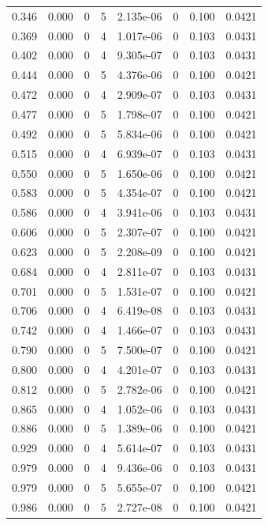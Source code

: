 \documentclass[preview]{standalone}
\begin{document}
{{\begin{tabular}{L{1.2cm}C{1.2cm} C{0.3cm}C{0.5cm} C{1.4cm}C{1.4cm} C{1.4cm}C{1.4cm}}
  0.346  &  0.000  & 0     &  5 &  2.135e-06  & 0  & 0.100 &  0.0421   \\ 
  0.369  &  0.000  & 0     &  4 &  1.017e-06  & 0  & 0.103 &  0.0431   \\ 
  0.402  &  0.000  & 0     &  4 &  9.305e-07  & 0  & 0.103 &  0.0431   \\ 
  0.444  &  0.000  & 0     &  5 &  4.376e-06  & 0  & 0.100 &  0.0421   \\ 
  0.472  &  0.000  & 0     &  4 &  2.909e-07  & 0  & 0.103 &  0.0431   \\ 
  0.477  &  0.000  & 0     &  5 &  1.798e-07  & 0  & 0.100 &  0.0421   \\ 
  0.492  &  0.000  & 0     &  5 &  5.834e-06  & 0  & 0.100 &  0.0421   \\ 
  0.515  &  0.000  & 0     &  4 &  6.939e-07  & 0  & 0.103 &  0.0431   \\ 
  0.550  &  0.000  & 0     &  5 &  1.650e-06  & 0  & 0.100 &  0.0421   \\ 
  0.583  &  0.000  & 0     &  5 &  4.354e-07  & 0  & 0.100 &  0.0421   \\ 
  0.586  &  0.000  & 0     &  4 &  3.941e-06  & 0  & 0.103 &  0.0431   \\ 
  0.606  &  0.000  & 0     &  5 &  2.307e-07  & 0  & 0.100 &  0.0421   \\ 
  0.623  &  0.000  & 0     &  5 &  2.208e-09  & 0  & 0.100 &  0.0421   \\ 
  0.684  &  0.000  & 0     &  4 &  2.811e-07  & 0  & 0.103 &  0.0431   \\ 
  0.701  &  0.000  & 0     &  5 &  1.531e-07  & 0  & 0.100 &  0.0421   \\ 
  0.706  &  0.000  & 0     &  4 &  6.419e-08  & 0  & 0.103 &  0.0431   \\ 
  0.742  &  0.000  & 0     &  4 &  1.466e-07  & 0  & 0.103 &  0.0431   \\ 
  0.790  &  0.000  & 0     &  5 &  7.500e-07  & 0  & 0.100 &  0.0421   \\ 
  0.800  &  0.000  & 0     &  4 &  4.201e-07  & 0  & 0.103 &  0.0431   \\ 
  0.812  &  0.000  & 0     &  5 &  2.782e-06  & 0  & 0.100 &  0.0421   \\ 
  0.865  &  0.000  & 0     &  4 &  1.052e-06  & 0  & 0.103 &  0.0431   \\ 
  0.886  &  0.000  & 0     &  5 &  1.389e-06  & 0  & 0.100 &  0.0421   \\ 
  0.929  &  0.000  & 0     &  4 &  5.614e-07  & 0  & 0.103 &  0.0431   \\ 
  0.979  &  0.000  & 0     &  4 &  9.436e-06  & 0  & 0.103 &  0.0431   \\ 
  0.979  &  0.000  & 0     &  5 &  5.655e-07  & 0  & 0.100 &  0.0421   \\ 
  0.986  &  0.000  & 0     &  5 &  2.727e-08  & 0  & 0.100 &  0.0421   \\ 
\hline 
\end{tabular} 

}}
\end{document}

